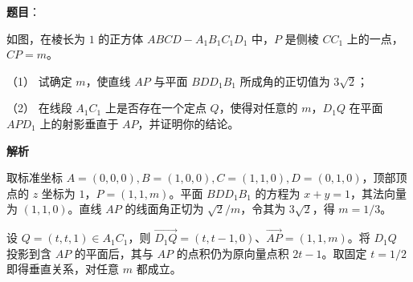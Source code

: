 \begin{answer}

\textbf{题目}：

如图，在棱长为 $1$ 的正方体 $ABCD-A_1B_1C_1D_1$ 中，$P$ 是侧棱 $CC_1$ 上的一点，$CP=m$。

（1） 试确定 $m$，使直线 $AP$ 与平面 $BDD_1B_1$ 所成角的正切值为 $3\sqrt2$；

（2） 在线段 $A_1C_1$ 上是否存在一个定点 $Q$，使得对任意的 $m$，$D_1Q$ 在平面 $APD_1$ 上的射影垂直于 $AP$，并证明你的结论。
\nopagebreak[4]
\begin{center}\end{center}
\nopagebreak[4]
\textbf{解析}


取标准坐标 $A=(0,0,0),B=(1,0,0),C=(1,1,0),D=(0,1,0)$，顶部顶点的 $z$ 坐标为 $1$，$P=(1,1,m)$。平面 $BDD_1B_1$ 的方程为 $x+y=1$，其法向量为 $(1,1,0)$。直线 $AP$ 的线面角正切为 $\sqrt2/m$，令其为 $3\sqrt2$，得 $m=1/3$。


设 $Q=(t,t,1)\in A_1C_1$，则 $\overrightarrow{D_1Q}=(t,t-1,0)$、$\overrightarrow{AP}=(1,1,m)$。将 $D_1Q$ 投影到含 $AP$ 的平面后，其与 $AP$ 的点积仍为原向量点积 $2t-1$。取固定 $t=1/2$ 即得垂直关系，对任意 $m$ 都成立。



\end{answer}
